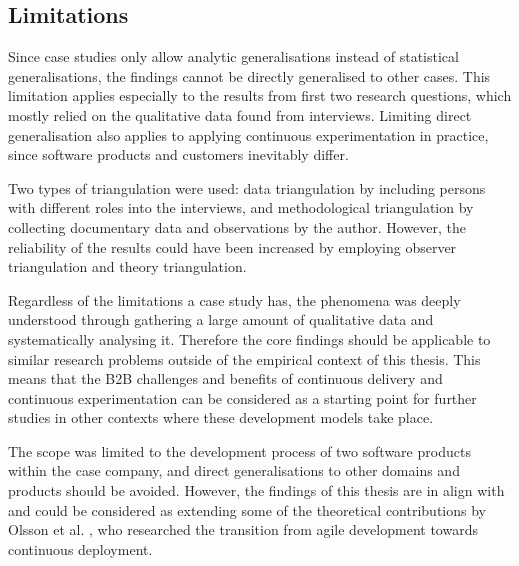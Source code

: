 \documentclass[english]{tktltiki2}
\theoremstyle{definition}
\theoremstyle{remark}
\begin{document}

\subsection{Limitations}
Since case studies only allow analytic generalisations instead of statistical generalisations, the findings cannot be directly generalised to other cases. This limitation applies especially to the results from first two research questions, which mostly relied on the qualitative data found from interviews. Limiting direct generalisation also applies to applying continuous experimentation in practice, since software products and customers inevitably differ. 

Two types of triangulation were used: data triangulation by including persons with different roles into the interviews, and methodological triangulation by collecting documentary data and observations by the author. However, the reliability of the results could have been increased by employing observer triangulation and theory triangulation. 

Regardless of the limitations a case study has, the phenomena was deeply understood through gathering a large amount of qualitative data and systematically analysing it. %
Therefore the core findings should be applicable to similar research problems outside of the empirical context of this thesis. This means that the B2B challenges and benefits of continuous delivery and continuous experimentation can be considered as a starting point for further studies in other contexts where these development models take place.

The scope was limited to the development process of two software products within the case company, and direct generalisations to other domains and products should be avoided. However, the findings of this thesis are in align with and could be considered as extending some of the theoretical contributions by Olsson et al. \cite{olsson2012climbing}, who researched the transition from agile development towards continuous deployment. 
\end{document}
